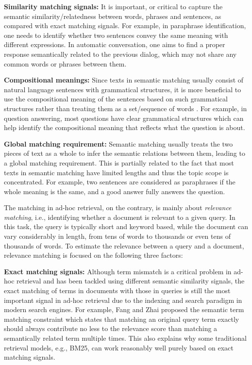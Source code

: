\documentclass{sig-alternate-05-2015}
\begin{document}
\textbf{Similarity matching signals:} It is important, or critical to capture the semantic similarity/relatedness between words, phrases and sentences, as compared with exact matching signals. For example, in paraphrase identification, one needs to identify whether two sentences convey the same meaning with different expressions. In automatic conversation, one aims to find a proper response semantically related to the previous dialog, which may not share any common words or phrases between them.

\textbf{Compositional meanings:} Since texts in semantic matching usually consist of natural language sentences with grammatical structures, it is more beneficial to use the compositional meaning of the sentences based on such grammatical structures rather than treating them as a set/sequence of words \cite{socher2011dynamic}. For example, in question answering, most questions have clear grammatical structures which can help identify the compositional meaning that reflects what the question is about.

\textbf{Global matching requirement:} Semantic matching usually treats the two pieces of text as a whole to infer the semantic relations between them, leading to a global matching requirement. This is partially related to the fact that most texts in semantic matching have limited lengths and thus the topic scope is concentrated. For example, two sentences are considered as paraphrases if the whole meaning is the same, and a good answer fully answers the question.


The matching in ad-hoc retrieval, on the contrary, is mainly about \textit{relevance matching}, i.e., identifying whether a document is relevant to a given query. In this task, the query is typically short and keyword based, while the document can vary considerably in length, from tens of words to thousands or even tens of thousands of words. To estimate the relevance between a query and a document, relevance matching is focused on the following three factors:

\textbf{Exact matching signals:} Although term mismatch is a critical problem in ad-hoc retrieval and has been tackled using different semantic similarity signals, the exact matching of terms in documents with those in queries is still the most important signal in ad-hoc retrieval due to the indexing and search paradigm in modern search engines. For example, Fang and Zhai \cite{fang2006semantic} proposed the semantic term matching constraint which states that matching an original query term exactly should always contribute no less to the relevance score than matching a semantically related term multiple times.
This also explains why some traditional retrieval models, e.g., BM25, can work reasonably well purely based on exact matching signals.
\end{document}
